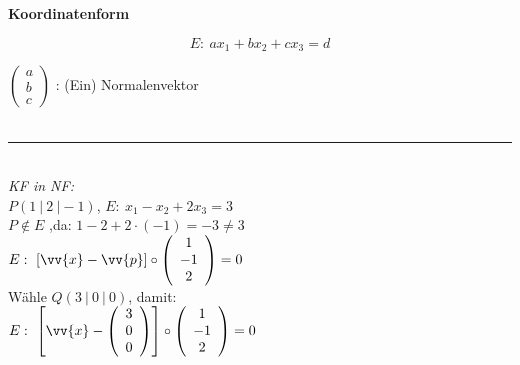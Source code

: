 \begin{minipage}[t]{0.49\textwidth}
    \textbf{Koordinatenform}

    $$E: \ ax_1 + bx_2 + cx_3 = d$$
    
    $\left(\begin{array}{c}  a \\ b \\ c \end{array}\right)$ : (Ein) Normalenvektor \\
    \\
    \noindent\rule{\textwidth}{1pt} \\
    \textit{KF in NF:}\\
    
    $P(1 \ | \ 2 \ | -1)$, $E: \ x_1 - x_2 + 2x_3 = 3$ \\
    $P \not\in E$ ,da: $1 - 2 + 2 \cdot (-1) = -3  \neq 3$ \\

    $E: \ \left[\vv{x} - \vv{p}\right] \circ \left(\begin{array}{c}  1 \\ -1 \\ 2 \end{array}\right) = 0$ \footnotemark\\

    Wähle $Q(3 \ | \ 0 \ | \ 0)$, damit: \\ 

    $E: \ \left[\vv{x} - \left(\begin{array}{c}  3 \\ 0 \\ 0 \end{array}\right)\right] \circ \left(\begin{array}{c}  1 \\ -1 \\ 2 \end{array}\right) = 0$ \\
\end{minipage}


